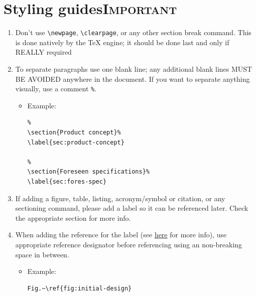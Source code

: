 \documentclass[11pt]{article}
\begin{document}
\section{Styling guides\hfill{}\textsc{Important}}
\label{sec:orga642a07}
\begin{enumerate}
\item Don't use \texttt{\textbackslash{}newpage}, \texttt{\textbackslash{}clearpage}, or any other section break command. This
is done natively by the \TeX{} engine; it should be done last and only if REALLY
required
\item To separate paragraphs use one blank line; any additional blank lines MUST BE
AVOIDED anywhere in the document. If you want to separate anything visually,
use a comment \texttt{\%}.
\begin{itemize}
\item Example:
\lstset{language=[LaTeX]TeX,label= ,caption= ,captionpos=b,numbers=none}
\begin{lstlisting}
%
\section{Product concept}%
\label{sec:product-concept}

%
\section{Foreseen specifications}%
\label{sec:fores-spec}

\end{lstlisting}
\end{itemize}
\item If adding a figure, table, listing, acronym/symbol or citation, or any
sectioning command, please add a label so it can be referenced later. Check
the appropriate section for more info.
\item When adding the reference for the label (see \hyperref[sec:org4434181]{here} for more info), use
appropriate reference designator before referencing using an non-breaking
space in between.
\begin{itemize}
\item Example:
\lstset{language=[LaTeX]TeX,label= ,caption= ,captionpos=b,numbers=none}
\begin{lstlisting}
Fig.~\ref{fig:initial-design}
\end{lstlisting}
\end{itemize}
\end{enumerate}
\end{document}
